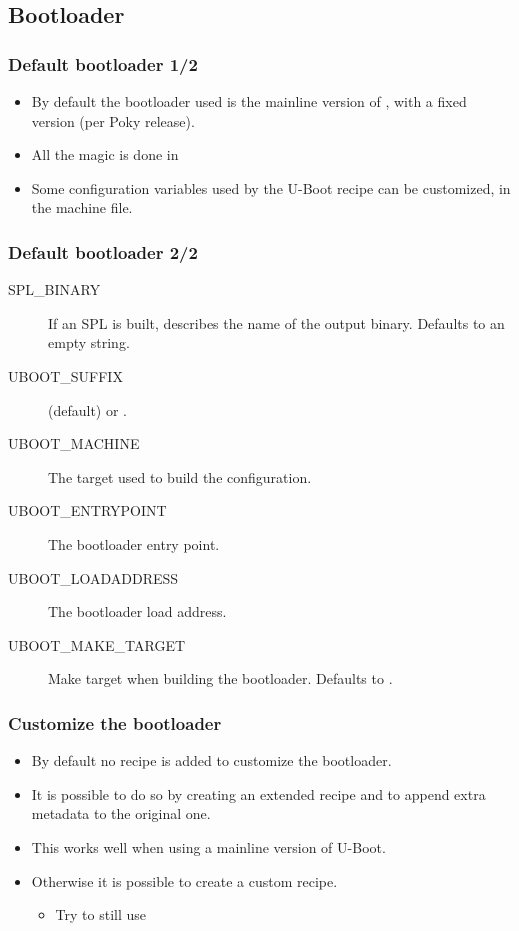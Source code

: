 \subsection{Bootloader}

\begin{frame}
  \frametitle{Default bootloader 1/2}
  \begin{itemize}
    \item By default the bootloader used is the mainline version of
      , with a fixed version (per Poky release).
    \item All the magic is done in
    \item Some configuration variables used by the U-Boot recipe can
      be customized, in the machine file.
  \end{itemize}
\end{frame}

\begin{frame}
  \frametitle{Default bootloader 2/2}
  \begin{description}
    \item[SPL\_BINARY] If an SPL is built, describes the name of the
      output binary. Defaults to an empty string.
    \item[UBOOT\_SUFFIX]  (default) or .
    \item[UBOOT\_MACHINE] The target used to build the configuration.
    \item[UBOOT\_ENTRYPOINT] The bootloader entry point.
    \item[UBOOT\_LOADADDRESS] The bootloader load address.
    \item[UBOOT\_MAKE\_TARGET] Make target when building the
      bootloader.  Defaults to .
  \end{description}
\end{frame}

\begin{frame}
  \frametitle{Customize the bootloader}
  \begin{itemize}
    \item By default no recipe is added to customize the bootloader.
    \item It is possible to do so by creating an extended recipe and
      to append extra metadata to the original one.
    \item This works well when using a mainline version of U-Boot.
    \item Otherwise it is possible to create a custom recipe.
      \begin{itemize}
        \item Try to still use
      \end{itemize}
  \end{itemize}
\end{frame}

